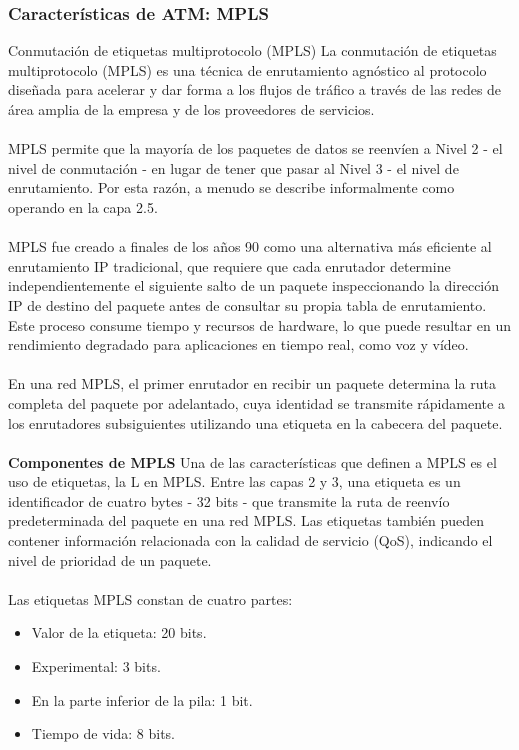 \documentclass[12pt,letterpaper]{article}
\begin{document}
\subsubsection{Características de ATM: MPLS}
Conmutación de etiquetas multiprotocolo (MPLS)
La conmutación de etiquetas multiprotocolo (MPLS) es una técnica de enrutamiento agnóstico 
al protocolo diseñada para acelerar y dar forma a los flujos de tráfico a través de las 
redes de área amplia de la empresa y de los proveedores de servicios.
\\ \\
MPLS permite que la mayoría de los paquetes de datos se reenvíen a Nivel 2 - el nivel 
de conmutación - en lugar de tener que pasar al Nivel 3 - el nivel de enrutamiento. Por 
esta razón, a menudo se describe informalmente como operando en la capa 2.5.
\\ \\
MPLS fue creado a finales de los años 90 como una alternativa más eficiente al 
enrutamiento IP tradicional, que requiere que cada enrutador determine independientemente 
el siguiente salto de un paquete inspeccionando la dirección IP de destino del paquete 
antes de consultar su propia tabla de enrutamiento. Este proceso consume tiempo y 
recursos de hardware, lo que puede resultar en un rendimiento degradado para aplicaciones 
en tiempo real, como voz y vídeo.
\\ \\
En una red MPLS, el primer enrutador en recibir un paquete determina la ruta completa 
del paquete por adelantado, cuya identidad se transmite rápidamente a los enrutadores 
subsiguientes utilizando una etiqueta en la cabecera del paquete.
\\ \\
\textbf{Componentes de MPLS}
\newline
Una de las características que definen a MPLS es el uso de etiquetas, la L en MPLS. 
Entre las capas 2 y 3, una etiqueta es un identificador de cuatro bytes - 32 bits - 
que transmite la ruta de reenvío predeterminada del paquete en una red MPLS. Las 
etiquetas también pueden contener información relacionada con la calidad de 
servicio (QoS), indicando el nivel de prioridad de un paquete.
\\ \\
Las etiquetas MPLS constan de cuatro partes:
\begin{itemize}
    \item Valor de la etiqueta: 20 bits.
    \item Experimental: 3 bits.
    \item En la parte inferior de la pila: 1 bit.
    \item Tiempo de vida: 8 bits.
\end{itemize}
\end{document}
